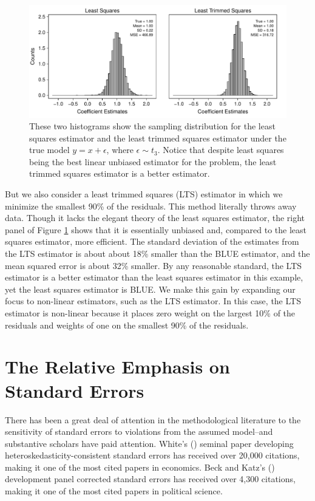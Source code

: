 \documentclass[12pt]{article}
\begin{document}
\begin{figure}[h!]
\begin{center}
\includegraphics[scale = .7]{figs/lts-illustration.pdf}
\caption{These two histograms show the sampling distribution for the least squares estimator and the least trimmed squares estimator under the true model $y = x + \epsilon$, where $\epsilon \sim t_3$. 
Notice that despite least squares being the best linear unbiased estimator for the problem, the least trimmed squares estimator is a better estimator.}\label{fig:lts-illustration}
\end{center}
\end{figure}

But we also consider a least trimmed squares (LTS) estimator in which we minimize the smallest 90\% of the residuals. 
This method literally throws away data. 
Though it lacks the elegant theory of the least squares estimator, the right panel of Figure \ref{fig:lts-illustration} shows that it is essentially unbiased and, compared to the least squares estimator, more efficient. 
The standard deviation of the estimates from the LTS estimator is about about 18\% smaller than the BLUE estimator, and the mean squared error is about 32\% smaller. 
By any reasonable standard, the LTS estimator is a better estimator than the least squares estimator in this example, yet the least squares estimator is BLUE. 
We make this gain by expanding our focus to non-linear estimators, such as the LTS estimator. 
In this case, the LTS estimator is non-linear because it places zero weight on the largest 10\% of the residuals and weights of one on the smallest 90\% of the residuals.

\section*{The Relative Emphasis on Standard Errors}

There has been a great deal of attention in the methodological literature to the sensitivity of standard errors to violations from the assumed model--and substantive scholars have paid attention.
White's (\citeyear{White1980}) seminal paper developing heteroskedasticity-consistent standard errors has received over 20,000 citations, making it one of the most cited papers in economics.
Beck and Katz's (\citeyear{BeckKatz1995}) development panel corrected standard errors has received over 4,300 citations, making it one of the most cited papers in political science.
\end{document}
